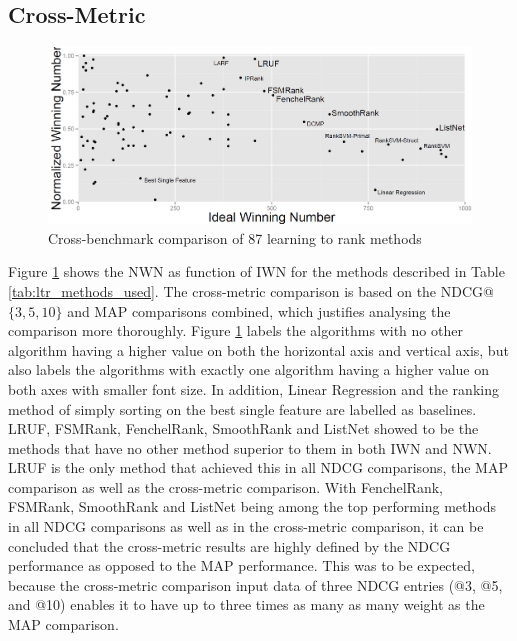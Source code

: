 \documentclass[english, authoryear, preprint]{elsarticle}
\begin{document}
\subsection{Cross-Metric}
\begin{figure}
\centering
\includegraphics[scale=0.28]{gfx/combined_normalized_winnum}
\caption{Cross-benchmark comparison of 87 learning to rank methods}
\label{fig:normalized_winning_number_all}
\end{figure}
Figure \ref{fig:normalized_winning_number_all} shows the NWN as function of IWN for the methods described in Table \ref{tab:ltr_methods_used}. The cross-metric comparison is based on the NDCG@$\{3,5,10\}$ and MAP comparisons combined, which justifies analysing the comparison more thoroughly. Figure \ref{fig:normalized_winning_number_all} labels the algorithms with no other algorithm having a higher value on both the horizontal axis and vertical axis, but also labels the algorithms with exactly one algorithm having a higher value on both axes with smaller font size. In addition, Linear Regression and the ranking method of simply sorting on the best single feature are labelled as baselines.\\

LRUF, FSMRank, FenchelRank, SmoothRank and ListNet showed to be the methods that have no other method superior to them in both IWN and NWN. LRUF is the only method that achieved this in all NDCG comparisons, the MAP comparison as well as the cross-metric comparison. With FenchelRank, FSMRank, SmoothRank and ListNet being among the top performing methods in all NDCG comparisons as well as in the cross-metric comparison, it can be concluded that the cross-metric results are highly defined by the NDCG performance as opposed to the MAP performance. This was to be expected, because the cross-metric comparison input data of three NDCG entries (@3, @5, and @10) enables it to have up to three times as many as many weight as the MAP comparison.\\
\end{document}
